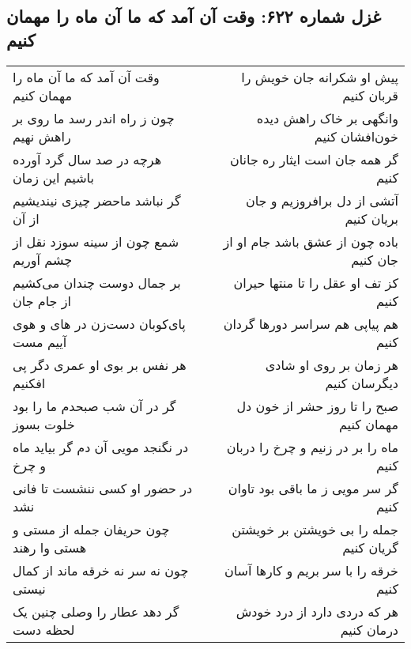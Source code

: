 \begin{center}
\section*{غزل شماره ۶۲۲: وقت آن آمد که ما آن ماه را مهمان کنیم}
\label{sec:622}
\begin{longtable}{l p{0.5cm} r}
وقت آن آمد که ما آن ماه را مهمان کنیم
&&
پیش او شکرانه جان خویش را قربان کنیم
\\
چون ز راه اندر رسد ما روی بر راهش نهیم
&&
وانگهی بر خاک راهش دیده خون‌افشان کنیم
\\
هرچه در صد سال گرد آورده باشیم این زمان
&&
گر همه جان است ایثار ره جانان کنیم
\\
گر نباشد ماحضر چیزی نیندیشیم از آن
&&
آتشی از دل برافروزیم و جان بریان کنیم
\\
شمع چون از سینه سوزد نقل از چشم آوریم
&&
باده چون از عشق باشد جام او از جان کنیم
\\
بر جمال دوست چندان می‌کشیم از جام جان
&&
کز تف او عقل را تا منتها حیران کنیم
\\
پای‌کوبان دست‌زن در های و هوی آییم مست
&&
هم پیاپی هم سراسر دورها گردان کنیم
\\
هر نفس بر بوی او عمری دگر پی افکنیم
&&
هر زمان بر روی او شادی دیگرسان کنیم
\\
گر در آن شب صبحدم ما را بود خلوت بسوز
&&
صبح را تا روز حشر از خون دل مهمان کنیم
\\
در نگنجد مویی آن دم گر بیاید ماه و چرخ
&&
ماه را بر در زنیم و چرخ را دربان کنیم
\\
در حضور او کسی ننشست تا فانی نشد
&&
گر سر مویی ز ما باقی بود تاوان کنیم
\\
چون حریفان جمله از مستی و هستی وا رهند
&&
جمله را بی خویشتن بر خویشتن گریان کنیم
\\
چون نه سر نه خرقه ماند از کمال نیستی
&&
خرقه را با سر بریم و کارها آسان کنیم
\\
گر دهد عطار را وصلی چنین یک لحظه دست
&&
هر که دردی دارد از درد خودش درمان کنیم
\\
\end{longtable}
\end{center}
